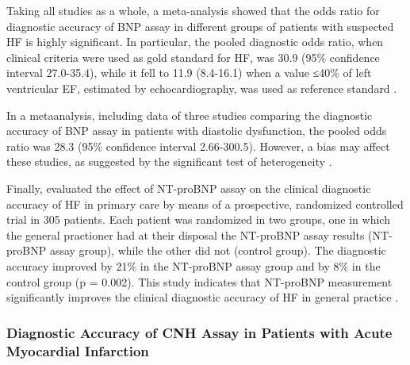 \documentclass[14pt,a4paper,onecolumn]{extarticle}
\begin{document}
Taking all studies as a whole, a meta-analysis showed that the odds ratio for diagnostic accuracy of BNP assay in different groups of patients with suspected HF is highly significant. In particular, the pooled diagnostic odds ratio, when clinical criteria were used as gold standard for HF, was 30.9 (95\% confidence interval 27.0-35.4), while it fell to 11.9 (8.4-16.1) when a value ≤40\% of left ventricular EF, estimated by echocardiography, was used as reference standard \citep{bib372}.


In a metaanalysis, including data of three studies comparing the diagnostic accuracy of BNP assay in patients with diastolic dysfunction, the pooled odds ratio was 28.3 (95\% confidence interval 2.66-300.5). However, a bias may affect these studies, as suggested by the significant test of heterogeneity \citep{bib372}.

Finally, \citep{bib3133} evaluated the effect of NT-proBNP assay on the clinical diagnostic accuracy of HF in primary care by means of a prospective, randomized controlled trial in 305 patients. Each patient was randomized in two groups, one in which the general practioner had at their disposal the NT-proBNP assay results (NT-proBNP assay group), while the other did not (control group). The diagnostic accuracy improved by 21\% in the NT-proBNP assay group and by 8\% in the control group (p = 0.002). This study indicates that NT-proBNP measurement significantly improves the clinical diagnostic accuracy of HF in general practice \citep{bib3133}.

\subsubsection{ Diagnostic Accuracy of CNH Assay in Patients with Acute Myocardial Infarction}
\end{document}
